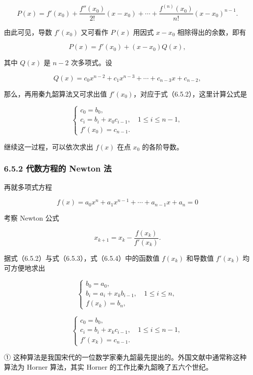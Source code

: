 \[
P(x)=f'(x_0)+\frac{f''(x_0)}{2!}(x-x_0)+\cdots+\frac{f^{(n)}(x_0)}{n!}(x-x_0)^{n-1}.
\]

由此可见，导数 \(f'(x_0)\) 又可看作 \(P(x)\) 用因式 \(x-x_0\) 相除得出的余数，即有

\[
P(x)=f'(x_0)+(x-x_0)Q(x),
\]

其中 \(Q(x)\) 是 \(n-2\) 次多项式。设

\[
Q(x)=c_0x^{n-2}+c_1x^{n-3}+\cdots+c_{n-3}x+c_{n-2},
\]

那么，再用秦九韶算法又可求出值 \(f'(x_0)\)，对应于式（6.5.2），这里计算公式是

\[
\begin{cases}
c_0=b_0,\\
c_i=b_i+x_0c_{i-1},\quad1\leqslant i\leqslant n-1,\\
f'(x_0)=c_{n-1}.
\end{cases}
\tag{6.5.3}
\]

继续这一过程，可以依次求出 \(f(x)\) 在点 \(x_0\) 的各阶导数。

\subsubsection{6.5.2 代数方程的 Newton 法}\label{ch06-ux4ee3ux6570ux65b9ux7a0bux7684-newton-ux6cd5}

再就多项式方程

\[
f(x)=a_0x^n+a_1x^{n-1}+\cdots+a_{n-1}x+a_n=0
\]

考察 Newton 公式

\[
x_{k+1}=x_k-\frac{f(x_k)}{f'(x_k)}.
\tag{6.5.4}
\]

据式（6.5.2）与式（6.5.3），式（6.5.4）中的函数值 \(f(x_k)\) 和导数值 \(f'(x_k)\) 均可方便地求出

\[
\begin{cases}
b_0=a_0,\\
b_i=a_i+x_kb_{i-1},\quad1\leqslant i\leqslant n,\\
f(x_k)=b_n,
\end{cases}
\tag{6.5.5}
\]

\[
\begin{cases}
c_0=b_0,\\
c_i=b_i+x_kc_{i-1},\quad1\leqslant i\leqslant n-1,\\
f'(x_k)=c_{n-1}.
\end{cases}
\tag{6.5.6}
\]

① 这种算法是我国宋代的一位数学家秦九韶最先提出的。外国文献中通常称这种算法为 Horner 算法，其实 Horner 的工作比秦九韶晚了五六个世纪。

